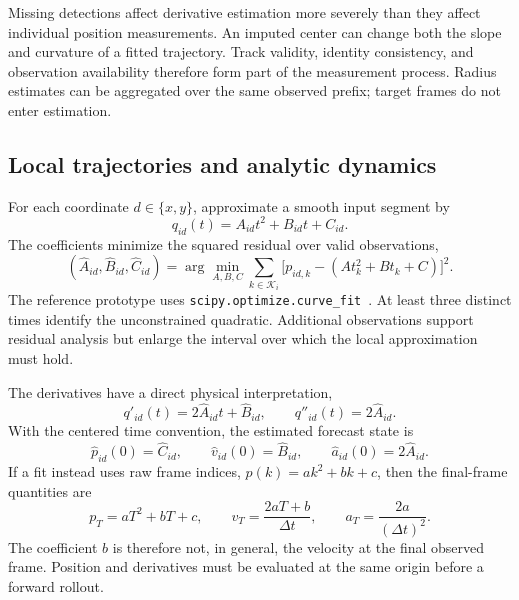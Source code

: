 \documentclass{article}
\begin{document}
Missing detections affect derivative estimation more severely than they affect individual position measurements. An imputed center can change both the slope and curvature of a fitted trajectory. Track validity, identity consistency, and observation availability therefore form part of the measurement process. Radius estimates can be aggregated over the same observed prefix; target frames do not enter estimation.

\subsection{Local trajectories and analytic dynamics}

For each coordinate $d\in\{x,y\}$, approximate a smooth input segment by
\begin{equation}
  q_{id}(t)=A_{id}t^2+B_{id}t+C_{id}.
  \label{eq:quadratic}
\end{equation}
The coefficients minimize the squared residual over valid observations,
\begin{equation}
  (\hat A_{id},\hat B_{id},\hat C_{id})
  =\arg\min_{A,B,C}\sum_{k\in\mathcal K_i}
  \bigl[p_{id,k}-(A t_k^2+B t_k+C)\bigr]^2.
  \label{eq:fit}
\end{equation}
The reference prototype uses \texttt{scipy.optimize.curve\_fit}~\citep{scipycurvefit}. At least three distinct times identify the unconstrained quadratic. Additional observations support residual analysis but enlarge the interval over which the local approximation must hold.

The derivatives have a direct physical interpretation,
\begin{equation}
  q'_{id}(t)=2\hat A_{id}t+\hat B_{id},\qquad
  q''_{id}(t)=2\hat A_{id}.
\end{equation}
With the centered time convention, the estimated forecast state is
\begin{equation}
  \hat p_{id}(0)=\hat C_{id},\qquad
  \hat v_{id}(0)=\hat B_{id},\qquad
  \hat a_{id}(0)=2\hat A_{id}.
  \label{eq:derivatives}
\end{equation}
If a fit instead uses raw frame indices, $p(k)=a k^2+b k+c$, then the final-frame quantities are
\begin{equation}
  p_T=aT^2+bT+c,\qquad
  v_T=\frac{2aT+b}{\Delta t},\qquad
  a_T=\frac{2a}{(\Delta t)^2}.
  \label{eq:units}
\end{equation}
The coefficient $b$ is therefore not, in general, the velocity at the final observed frame. Position and derivatives must be evaluated at the same origin before a forward rollout.
\end{document}
